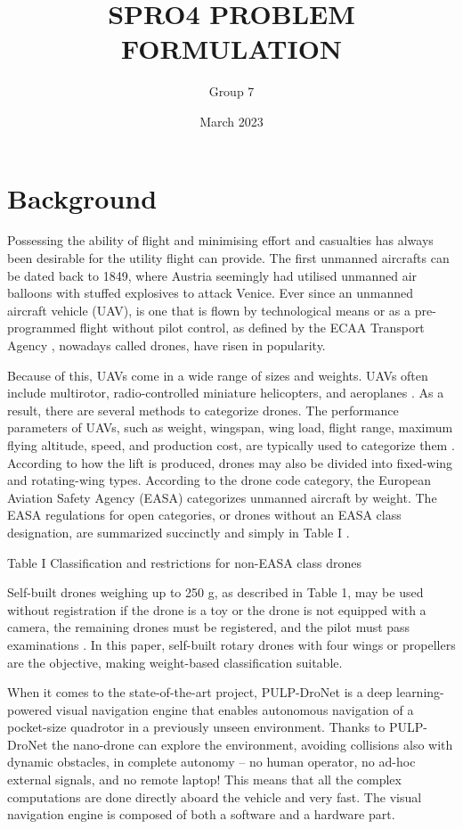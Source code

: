 \documentclass[a4paper,11pt]{article}
\title{SPRO4 PROBLEM FORMULATION}
\author{Group 7}
\date{March 2023}
\begin{document}
\maketitle
 
\section{Background}

Possessing the ability of flight and minimising effort and casualties has always been desirable for the utility flight can provide. 
The first unmanned aircrafts can be dated back to 1849, where Austria seemingly had utilised unmanned air balloons with stuffed explosives to attack Venice. \cite{Vyas2020} 
Ever since an unmanned aircraft vehicle (UAV), is one that is flown by technological means or as a pre-programmed flight without pilot control, as defined by the ECAA Transport Agency \cite{Droner}, nowadays called drones, have risen in popularity.   


Because of this, UAVs come in a wide range of sizes and weights.
UAVs often include multirotor, radio-controlled miniature helicopters, and aeroplanes \cite{Ann2012}. 
As a result, there are several methods to categorize drones. The performance parameters of UAVs, such as weight, wingspan, wing load, flight range, maximum flying altitude, speed, and production cost, are typically used to categorize them \cite{Hassanalian2017}. 
According to how the lift is produced, drones may also be divided into fixed-wing and rotating-wing types. 
According to the drone code category, the European Aviation Safety Agency (EASA) categorizes unmanned aircraft by weight. 
The EASA regulations for open categories, or drones without an EASA class designation, are summarized succinctly and simply in Table I \cite{Euasa}. 
 
\graphicspath{}
 Table I Classification and restrictions for non-EASA class drones \cite{Euasa} 

Self-built drones weighing up to 250 g, as described in Table 1, may be used without registration if the drone is a toy or the drone is not equipped with a camera, the remaining drones must be registered, and the pilot must pass examinations \cite{Euasa}. In this paper, self-built rotary drones with four wings or propellers are the objective, making weight-based classification suitable. 

When it comes to the state-of-the-art project, PULP-DroNet is a deep learning-powered visual navigation engine that enables autonomous navigation of a pocket-size quadrotor in a previously unseen environment. Thanks to PULP-DroNet the nano-drone can explore the environment, avoiding collisions also with dynamic obstacles, in complete autonomy -- no human operator, no ad-hoc external signals, and no remote laptop! This means that all the complex computations are done directly aboard the vehicle and very fast. The visual navigation engine is composed of both a software and a hardware part. \cite{Niculescu2021} 
\end{document}
